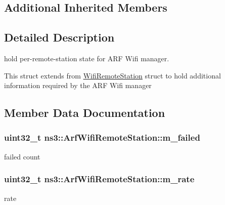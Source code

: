 \subsection*{Additional Inherited Members}


\subsection{Detailed Description}
hold per-\/remote-\/station state for A\+RF Wifi manager. 

This struct extends from \hyperlink{structns3_1_1WifiRemoteStation}{Wifi\+Remote\+Station} struct to hold additional information required by the A\+RF Wifi manager 

\subsection{Member Data Documentation}
\subsubsection[{\texorpdfstring{m\+\_\+failed}{m_failed}}]{\setlength{\rightskip}{0pt plus 5cm}uint32\+\_\+t ns3\+::\+Arf\+Wifi\+Remote\+Station\+::m\+\_\+failed}\hypertarget{structns3_1_1ArfWifiRemoteStation_a9b6449bdc757730b6e45cc2b3bec6929}{}\label{structns3_1_1ArfWifiRemoteStation_a9b6449bdc757730b6e45cc2b3bec6929}


failed count 

\subsubsection[{\texorpdfstring{m\+\_\+rate}{m_rate}}]{\setlength{\rightskip}{0pt plus 5cm}uint32\+\_\+t ns3\+::\+Arf\+Wifi\+Remote\+Station\+::m\+\_\+rate}\hypertarget{structns3_1_1ArfWifiRemoteStation_a0db99222ec1bbe4ab7222968b9bf2eb3}{}\label{structns3_1_1ArfWifiRemoteStation_a0db99222ec1bbe4ab7222968b9bf2eb3}


rate 

